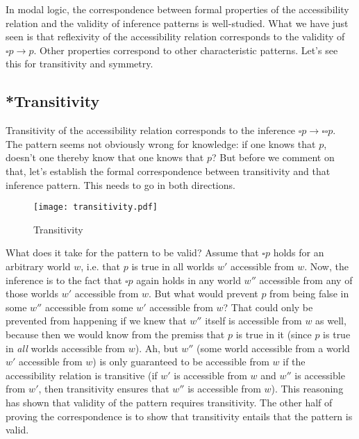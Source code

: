 In modal logic, the correspondence between formal properties of the
accessibility relation and the validity of inference patterns is
well-studied. What we have just seen is that reflexivity of the
accessibility relation corresponds to the validity of
$\square p \rightarrow p$. Other properties correspond to other
characteristic patterns. Let's see this for transitivity and symmetry.

\subsection{*Transitivity} \label{sec:transitivity}

Transitivity of the accessibility relation corresponds to the
inference $\square p \rightarrow \square \square p$.
The pattern seems not obviously wrong for knowledge: if one knows that
$p$, doesn't one thereby know that one knows that $p$? But before we
comment on that, let's establish the formal correspondence between
transitivity and that inference pattern. This needs to go in both
directions.
  
\begin{figure}[htbp]
  \centering
    \texttt{[image: transitivity.pdf]}
  \caption{Transitivity}
  \label{fig:transitivity}
\end{figure}

\noindent What does it take for the pattern to be valid? Assume that
$\square p$ holds for an arbitrary world $w$, i.e. that $p$ is true in
all worlds $w'$ accessible from $w$. Now, the inference is to the fact
that $\square p$ again holds in any world $w''$ accessible from any of
those worlds $w'$ accessible from $w$. But what would prevent $p$ from
being false in some $w''$ accessible from some $w'$ accessible from
$w$? That could only be prevented from happening if we knew that $w''$
itself is accessible from $w$ as well, because then we would know from
the premiss that $p$ is true in it (since $p$ is true in \emph{all}
worlds accessible from $w$). Ah, but $w''$ (some world accessible from
a world $w'$ accessible from $w$) is only guaranteed to be accessible
from $w$ if the accessibility relation is transitive (if $w'$ is
accessible from $w$ and $w''$ is accessible from $w'$, then
transitivity ensures that $w''$ is accessible from $w$). This
reasoning has shown that validity of the pattern requires
transitivity. The other half of proving the correspondence is to show
that transitivity entails that the pattern is valid.

